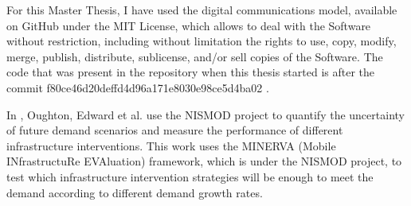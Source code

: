 
For this Master Thesis, I have used the digital communications model, available on GitHub \cite{3-04} under the MIT License, which allows \guillemotleft to deal with the Software without restriction, including without limitation the rights to use, copy, modify, merge, publish, distribute, sublicense, and/or sell copies of the Software\guillemotright . The code that was present in the repository when this thesis started is after the commit f80ce46d20deffd4d96a171e8030e98ce5d4ba02 \cite{3-09}.\par

In \cite{3-03}, Oughton, Edward et al. use the NISMOD project to quantify the uncertainty of future demand scenarios and measure the performance of different infrastructure interventions. This work uses the MINERVA (Mobile INfrastructuRe EVAluation) framework, which is under the NISMOD project, to test which infrastructure intervention strategies will be enough to meet the demand according to different demand growth rates.\par








